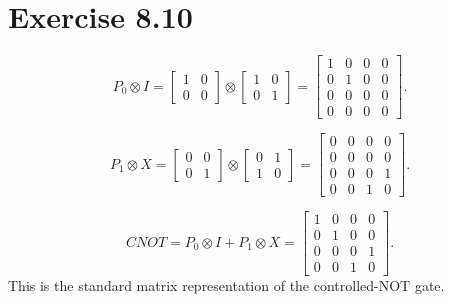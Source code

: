 \documentclass{article}
\begin{document}
\section*{Exercise 8.10}

\[
P_0 \otimes I =
\begin{bmatrix} 1 & 0 \\ 0 & 0 \end{bmatrix} \otimes \begin{bmatrix} 1 & 0 \\ 0 & 1 \end{bmatrix} =
\begin{bmatrix}
1 & 0 & 0 & 0 \\
0 & 1 & 0 & 0 \\
0 & 0 & 0 & 0 \\
0 & 0 & 0 & 0
\end{bmatrix}.
\]

\[
P_1 \otimes X =
\begin{bmatrix} 0 & 0 \\ 0 & 1 \end{bmatrix} \otimes \begin{bmatrix} 0 & 1 \\ 1 & 0 \end{bmatrix} =
\begin{bmatrix}
0 & 0 & 0 & 0 \\
0 & 0 & 0 & 0 \\
0 & 0 & 0 & 1 \\
0 & 0 & 1 & 0
\end{bmatrix}.
\]

\[
CNOT = P_0 \otimes I + P_1 \otimes X =
\begin{bmatrix}
1 & 0 & 0 & 0 \\
0 & 1 & 0 & 0 \\
0 & 0 & 0 & 1 \\
0 & 0 & 1 & 0
\end{bmatrix}.
\]
This is the standard matrix representation of the controlled-NOT gate.
\end{document}
